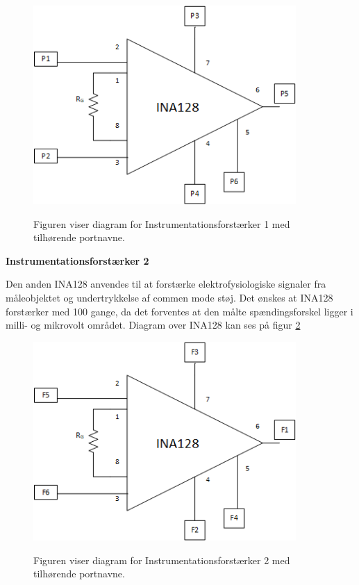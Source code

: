 \begin{figure}[H]
\centering
{\includegraphics[width=10cm]
{Figure/instrumentation1}}
\caption{Figuren viser diagram for Instrumentationsforstærker 1 med tilhørende portnavne.}
\label{fig:instrumentation1}
\end{figure}






\textbf{Instrumentationsforstærker 2}

Den anden INA128 anvendes til at forstærke elektrofysiologiske signaler fra måleobjektet og undertrykkelse af commen mode støj. Det ønskes at INA128 forstærker med 100 gange, da det forventes at den målte spændingsforskel ligger i milli- og mikrovolt området\cite{PeterJohansen2014}. Diagram over INA128 kan ses på figur \ref{fig:instrumentation2}

\begin{figure}[H]
\centering
{\includegraphics[width=10cm]
{Figure/instrumentation2}}
\caption{Figuren viser diagram for Instrumentationsforstærker 2 med tilhørende portnavne.}
\label{fig:instrumentation2}
\end{figure}


